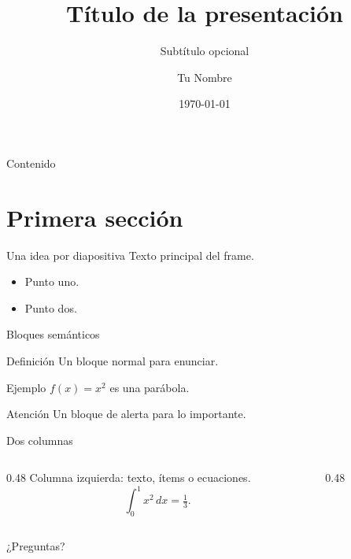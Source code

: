 \documentclass[10pt,aspectratio=169]{beamer}
\title[Título corto]{Título de la presentación}
\subtitle{Subtítulo opcional}
\author{Tu Nombre}
\institute[UAI]{Universidad Abierta Interamericana}
\date{\today}
\begin{document}
\begin{frame}[plain]
  \titlepage
\end{frame}

\begin{frame}{Contenido}
  \tableofcontents
\end{frame}

\section{Primera sección}
\begin{frame}{Una idea por diapositiva}
  Texto principal del frame.
  \begin{itemize}
    \item Punto uno.
    \item Punto dos.
  \end{itemize}
\end{frame}

\begin{frame}{Bloques semánticos}
  \begin{block}{Definición}
    Un bloque normal para enunciar.
  \end{block}
  \begin{exampleblock}{Ejemplo}
    $f(x) = x^2$ es una parábola.
  \end{exampleblock}
  \begin{alertblock}{Atención}
    Un bloque de alerta para lo importante.
  \end{alertblock}
\end{frame}

\begin{frame}{Dos columnas}
  \begin{columns}[T]
    \begin{column}{0.48\textwidth}
      Columna izquierda: texto, ítems o ecuaciones.
      \[ \int_0^1 x^2 \, dx = \tfrac{1}{3}. \]
    \end{column}
    \begin{column}{0.48\textwidth}
    \end{column}
  \end{columns}
\end{frame}


\begin{frame}[plain]
  \centering \Large ¿Preguntas?
\end{frame}
\end{document}
